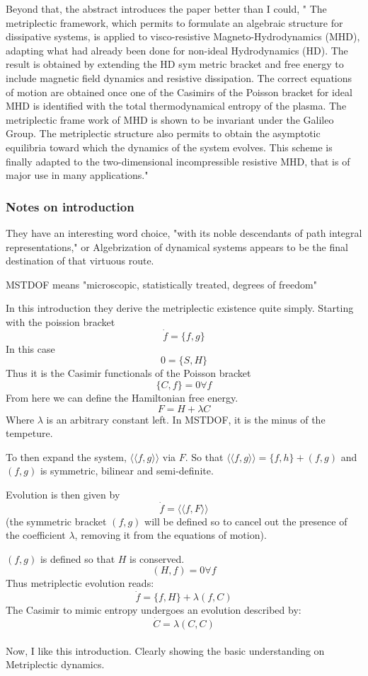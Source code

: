 Beyond that, the abstract introduces the paper better than I could,
" The metriplectic framework, which permits to formulate an algebraic structure for dissipative
 systems, is applied to visco-resistive Magneto-Hydrodynamics (MHD), adapting what had already
 been done for non-ideal Hydrodynamics (HD). The result is obtained by extending the HD sym
metric bracket and free energy to include magnetic field dynamics and resistive dissipation. The correct equations of motion are obtained once one of the Casimirs of the Poisson bracket for ideal MHD is identified with the total thermodynamical entropy of the plasma. The metriplectic frame work of MHD is shown to be invariant under the Galileo Group. The metriplectic structure also permits to obtain the asymptotic equilibria toward which the dynamics of the system evolves. This scheme is finally adapted to the two-dimensional incompressible resistive MHD, that is of major use in many applications."
\subsubsection{Notes on introduction}
They have an interesting word choice, "with its noble descendants of path integral representations," or Algebrization of dynamical systems appears to be the final destination of that virtuous route.

MSTDOF means "microscopic, statistically treated, degrees of freedom"

In this introduction they derive the metriplectic existence quite simply.
Starting with the poission bracket 
$$\dot{f}=\{f,g\}$$
In this case
$$0= \{S,H\}$$
Thus it is the Casimir functionals of the Poisson bracket
$$\{C,f\}=0 \forall f$$
From here we can define the Hamiltonian free energy. 
$$F=H+\lambda C $$
Where $\lambda$ is an arbitrary constant left. In MSTDOF, it is the minus of the tempeture.

To then expand the system, $\langle\langle f,g \rangle \rangle$ via $F$. So that $\langle\langle f, g\rangle \rangle=\{f,h\} + (f,g)$ and $(f,g)$ is symmetric, bilinear and semi-definite.

Evolution is then given by
$$\dot{f}=\langle\langle f, F\rangle \rangle$$
(the symmetric bracket $(f,g)$ will be defined so to cancel out the presence of the coefficient
 $\lambda$, removing it from the equations of motion).

 $(f,g)$ is defined so that $H$ is conserved.
 $$(H, f) = 0 \forall f$$
 Thus metriplectic evolution reads:
 $$\dot{f}=\{f,H\}+\lambda(f,C)$$
 The Casimir to mimic entropy undergoes an evolution described by:
 $$\dot{C}=\lambda(C,C)$$
 \\
 Now, I like this introduction. Clearly showing the basic understanding on Metriplectic dynamics.

